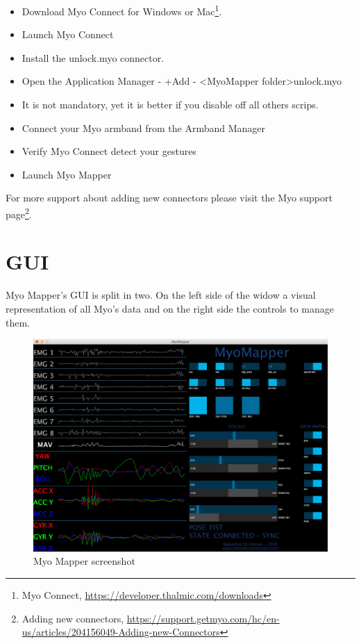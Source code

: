\documentclass[12pt,a4paper]{article}
\begin{document}
\begin{itemize}
	\item Download Myo Connect for Windows or Mac\footnote{Myo Connect, \url{https://developer.thalmic.com/downloads}}.
	\item Launch Myo Connect
	\item Install the unlock.myo connector.
	\item Open the Application Manager
	\subitem - +Add 
	\subitem - \textless MyoMapper folder\textgreater \textfractionsolidus unlock.myo
	\item It is not mandatory, yet it is better if you disable off all others scrips.
	\item Connect your Myo armband from the Armband Manager
	\item Verify Myo Connect detect your gestures
	\item Launch Myo Mapper
\end{itemize}

For more support about adding new connectors please visit the Myo support page\footnote{Adding new connectors, \url{https://support.getmyo.com/hc/en-us/articles/204156049-Adding-new-Connectors}}.

\newpage

\section{GUI}

	Myo Mapper's GUI is split in two. On the left side of the widow a visual representation of all Myo's data and on the right side the controls to manage them.
	
	\begin{figure}[h]
		\centering
		\includegraphics[width=1\linewidth]{../MyoMapper}
		\caption{Myo Mapper screenshot}
		\label{fig:MyoMapperGUI}
	\end{figure}
	
\end{document}
